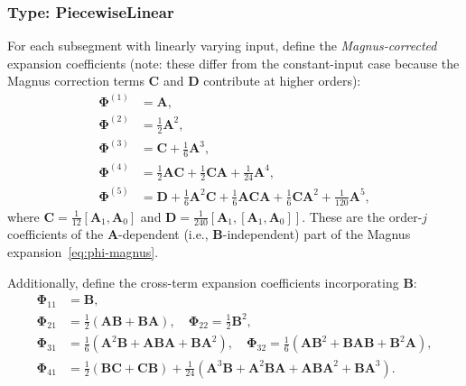 \documentclass[11pt,a4paper]{article}
\newcommand{\bPhi}{\bm{\Phi}}
\newcommand{\bA}{\mathbf{A}}
\newcommand{\bB}{\mathbf{B}}
\newcommand{\bC}{\mathbf{C}}
\newcommand{\bD}{\mathbf{D}}
\begin{document}
\subsubsection{Type: PiecewiseLinear}
For each subsegment with linearly varying input, define the \emph{Magnus-corrected} expansion coefficients (note: these differ from the constant-input case because the Magnus correction terms $\bC$ and $\bD$ contribute at higher orders):
\begin{align}
    \bPhi^{(1)} &= \bA, \nonumber\\
    \bPhi^{(2)} &= \tfrac{1}{2}\bA^2, \nonumber\\
    \bPhi^{(3)} &= \bC + \tfrac{1}{6}\bA^3, \nonumber\\
    \bPhi^{(4)} &= \tfrac{1}{2}\bA\bC + \tfrac{1}{2}\bC\bA + \tfrac{1}{24}\bA^4, \nonumber\\
    \bPhi^{(5)} &= \bD + \tfrac{1}{6}\bA^2\bC + \tfrac{1}{6}\bA\bC\bA + \tfrac{1}{6}\bC\bA^2 + \tfrac{1}{120}\bA^5,
    \label{eq:phi-magnus-coeff}
\end{align}
where $\bC = \frac{1}{12}[\bA_1, \bA_0]$ and $\bD = \frac{1}{240}[\bA_1, [\bA_1, \bA_0]]$.
These are the order-$j$ coefficients of the $\bA$-dependent (i.e., $\bB$-independent) part of the Magnus expansion~\eqref{eq:phi-magnus}.

Additionally, define the cross-term expansion coefficients incorporating $\bB$:
\begin{align}
    \bPhi_{11} &= \bB, \nonumber\\
    \bPhi_{21} &= \tfrac{1}{2}(\bA\bB + \bB\bA), \quad \bPhi_{22} = \tfrac{1}{2}\bB^2, \nonumber\\
    \bPhi_{31} &= \tfrac{1}{6}(\bA^2\bB + \bA\bB\bA + \bB\bA^2), \quad \bPhi_{32} = \tfrac{1}{6}(\bA\bB^2 + \bB\bA\bB + \bB^2\bA), \nonumber\\
    \bPhi_{41} &= \tfrac{1}{2}(\bB\bC + \bC\bB) + \tfrac{1}{24}(\bA^3\bB + \bA^2\bB\bA + \bA\bB\bA^2 + \bB\bA^3).
    \label{eq:phi-mixed}
\end{align}
\end{document}
